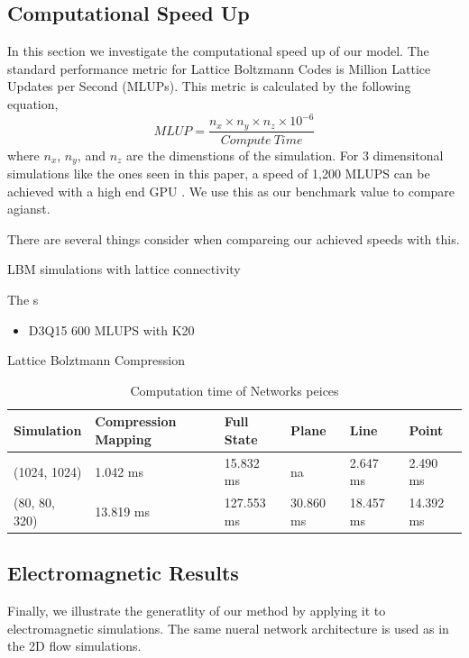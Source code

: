 \documentclass{article}
\begin{document}
\subsection{Computational Speed Up}

In this section we investigate the computational speed up of our model. The standard performance metric for Lattice Boltzmann Codes is Million Lattice Updates per Second (MLUPs). This metric is calculated by the following equation,
\begin{equation}
  MLUP = \frac{n_x \times n_y \times n_z \times 10^{-6}}{Compute \ Time}
\end{equation}
 where $n_x$, $n_y$, and $n_z$ are the dimenstions of the simulation. For 3 dimensitonal simulations like the ones seen in this paper, a speed of 1,200 MLUPS can be achieved with a high end GPU \cite{januszewski2014sailfish}. We use this as our benchmark value to compare agianst.

There are several things consider when compareing our achieved speeds with this.

LBM simulations with lattice connectivity 

The s

\begin{itemize}
  \item D3Q15 600 MLUPS with K20 \cite{januszewski2014sailfish}
\end{itemize}

Lattice Bolztmann Compression

\begin{table}[]
\caption{Computation time of Networks peices} \label{compute_times}
\centering
\begin{tabular}{|l|lllll|}
\hline
Simulation    & Compression Mapping & Full State  & Plane      & Line       & Point   \\ \hline
(1024, 1024)  & 1.042 ms            & 15.832 ms   & na         & 2.647 ms   & 2.490 ms \\ 
(80, 80, 320) & 13.819 ms           & 127.553 ms  & 30.860 ms  & 18.457 ms  & 14.392 ms \\ 
\hline
\end{tabular}
\end{table}

\subsection{Electromagnetic Results}

Finally, we illustrate the generatlity of our method by applying it to electromagnetic simulations. The same nueral network architecture is used as in the 2D flow simulations. 
\end{document}

